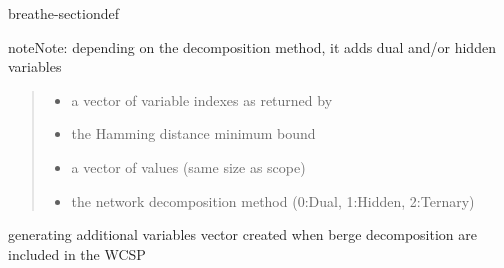 \documentclass[letterpaper,10pt,openany,oneside,english]{sphinxmanual}
\begin{document}
\begin{fulllineitems}
\begin{sphinxuseclass}{breathe-sectiondef}
\begin{fulllineitems}
\begin{sphinxadmonition}{note}{Note:}
\sphinxAtStartPar
depending on the decomposition method, it adds dual and/or hidden variables 
\end{sphinxadmonition}
\begin{quote}\begin{description}
\begin{itemize}
\item {} 
\sphinxAtStartPar
{} \textendash{} a vector of variable indexes as returned by {\hyperref[\detokenize{ref/ref_cpp:classWeightedCSP_1a2329c94c60817153e45de627c79f8281}]{}} 

\item {} 
\sphinxAtStartPar
{} \textendash{} the Hamming distance minimum bound 

\item {} 
\sphinxAtStartPar
{} \textendash{} a vector of values (same size as scope) 

\item {} 
\sphinxAtStartPar
{} \textendash{} the network decomposition method (0:Dual, 1:Hidden, 2:Ternary) 

\end{itemize}

\end{description}\end{quote}

\end{fulllineitems}


\begin{fulllineitems}
\label{\detokenize{ref/ref_cpp:_CPPv4N11WeightedCSP17getListSuccessorsEv}}\label{\detokenize{ref/ref_cpp:_CPPv3N11WeightedCSP17getListSuccessorsEv}}\label{\detokenize{ref/ref_cpp:_CPPv2N11WeightedCSP17getListSuccessorsEv}}\label{\detokenize{ref/ref_cpp:WeightedCSP::getListSuccessors}}
\pysigstartsignatures
\pysigstartmultiline
{}
\pysigstopmultiline
\pysigstopsignatures
\sphinxAtStartPar
generating additional variables vector created when berge decomposition are included in the WCSP 


\end{fulllineitems}
\end{sphinxuseclass}
\end{fulllineitems}
\end{document}
